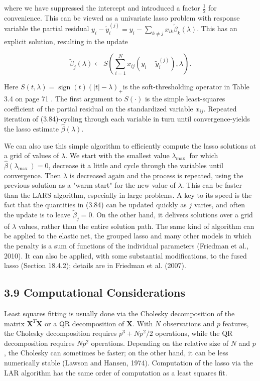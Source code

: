\documentclass[10pt]{article}
\begin{document}
where we have suppressed the intercept and introduced a factor $\frac{1}{2}$ for convenience. This can be viewed as a univariate lasso problem with response variable the partial residual $y_{i}-\tilde{y}_{i}^{(j)}=y_{i}-\sum_{k \neq j} x_{i k} \tilde{\beta}_{k}(\lambda)$. This has an explicit solution, resulting in the update


\begin{equation*}
\tilde{\beta}_{j}(\lambda) \leftarrow S\left(\sum_{i=1}^{N} x_{i j}\left(y_{i}-\tilde{y}_{i}^{(j)}\right), \lambda\right) . \tag{3.84}
\end{equation*}


Here $S(t, \lambda)=\operatorname{sign}(t)(|t|-\lambda)_{+}$is the soft-thresholding operator in Table 3.4 on page 71 . The first argument to $S(\cdot)$ is the simple least-squares coefficient of the partial residual on the standardized variable $x_{i j}$. Repeated iteration of (3.84)-cycling through each variable in turn until convergence-yields the lasso estimate $\hat{\beta}(\lambda)$.

We can also use this simple algorithm to efficiently compute the lasso solutions at a grid of values of $\lambda$. We start with the smallest value $\lambda_{\text {max }}$ for which $\hat{\beta}\left(\lambda_{\text {max }}\right)=0$, decrease it a little and cycle through the variables until convergence. Then $\lambda$ is decreased again and the process is repeated, using the previous solution as a "warm start" for the new value of $\lambda$. This can be faster than the LARS algorithm, especially in large problems. A key to its speed is the fact that the quantities in (3.84) can be updated quickly as $j$ varies, and often the update is to leave $\tilde{\beta}_{j}=0$. On the other hand, it delivers solutions over a grid of $\lambda$ values, rather than the entire solution path. The same kind of algorithm can be applied to the elastic net, the grouped lasso and many other models in which the penalty is a sum of functions of the individual parameters (Friedman et al., 2010). It can also be applied, with some substantial modifications, to the fused lasso (Section 18.4.2); details are in Friedman et al. (2007).

\subsection*{3.9 Computational Considerations}
Least squares fitting is usually done via the Cholesky decomposition of the matrix $\mathbf{X}^{T} \mathbf{X}$ or a QR decomposition of $\mathbf{X}$. With $N$ observations and $p$ features, the Cholesky decomposition requires $p^{3}+N p^{2} / 2$ operations, while the QR decomposition requires $N p^{2}$ operations. Depending on the relative size of $N$ and $p$, the Cholesky can sometimes be faster; on the other hand, it can be less numerically stable (Lawson and Hansen, 1974). Computation of the lasso via the LAR algorithm has the same order of computation as a least squares fit.
\end{document}
